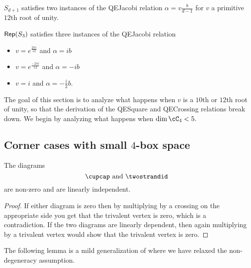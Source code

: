 \documentclass[12pt]{amsart}
\begin{document}
\begin{lemma}
$S_{d+1}$ satisfies two instances of the QEJacobi relation $\alpha = v \frac{b}{d-1}$ for $v$ a primitive $12$th root of unity.
\end{lemma}

\begin{lemma}
$\operatorname{\mathsf{Rep}}(S_3)$ satisfies three instances of the QEJacobi relation
\begin{itemize}
\item $v = e^{\frac{2 \pi i}{12}}$ and $\alpha = i b$
\item $v = e^{\frac{-2 \pi i}{12}}$ and $\alpha = -i b$
\item $v = i$ and $\alpha = -\frac{i}{2} b$.
\end{itemize}
\end{lemma}













The goal of this section is to analyze what happens when $v$ is a $10$th or $12$th root of unity, so that the derivation of the QESquare and QECrossing relations break down.  We begin by analyzing what happens when $\dim \cC_4 < 5.$

\subsection{Corner cases with small $4$-box space}

\begin{lemma}
The diagrams
$$\cupcap \text{ and } \twostrandid$$
are non-zero and are linearly independent.
\end{lemma}
\begin{proof}
If either diagram is zero then by multiplying by a crossing on the appropriate side you get that the trivalent vertex is zero, which is a contradiction.  If the two diagrams are linearly dependent, then again multiplying by a trivalent vertex would show that the trivalent vertex is zero.
\end{proof}


The following lemma is a mild generalization of where we have relaxed the non-degeneracy assumption.
\end{document}
